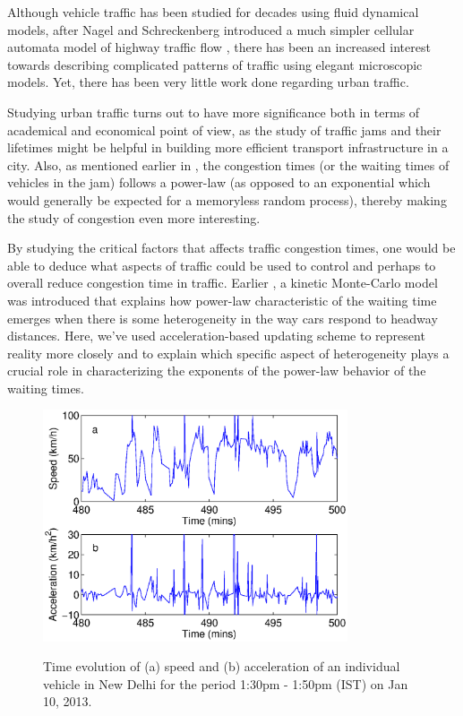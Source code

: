 \documentclass[conference]{IEEEtran}
\begin{document}
Although vehicle traffic has been studied for decades using fluid dynamical models, after Nagel and Schreckenberg introduced a much simpler cellular automata model of highway traffic flow \cite{Nagel1992}, there has been an increased interest towards describing complicated patterns of traffic using elegant microscopic models. Yet, there has been very little work done regarding urban traffic.

Studying urban traffic turns out to have more significance both in terms of academical and economical point of view, as the study of traffic jams and their lifetimes might be helpful in building more efficient transport infrastructure in a city. Also, as mentioned earlier in \cite{Majith2015}, the congestion times (or the waiting times of vehicles in the jam) follows a power-law (as opposed to an exponential which would generally be expected for a memoryless random process), thereby making the study of congestion even more interesting.

By studying the critical factors that affects traffic congestion times, one would be able to deduce what aspects of traffic could be used to control and perhaps to overall reduce congestion time in traffic. Earlier \cite{Majith2016}, a kinetic Monte-Carlo model was introduced that explains how power-law characteristic of the waiting time emerges when there is some heterogeneity in the way cars respond to headway distances. Here, we've used acceleration-based updating scheme to represent reality more closely and to explain which specific aspect of heterogeneity plays a crucial role in characterizing the exponents of the power-law behavior of the waiting times.

\begin{figure}
{    \includegraphics[width=9.0cm, angle=0]{fig1.eps}}
    \caption{Time evolution of (a) speed and (b) acceleration of an individual vehicle in New Delhi for the period 1:30pm - 1:50pm (IST) on Jan 10, 2013. }
    \label{taxi_acc}
\end{figure}
\end{document}
